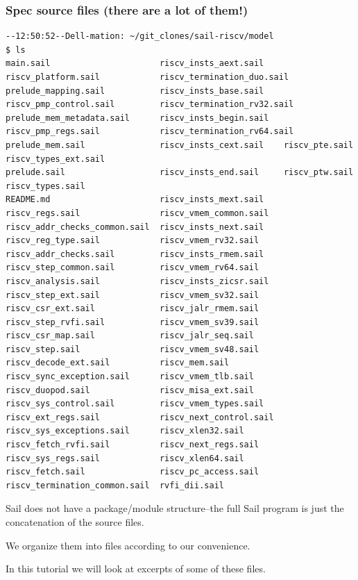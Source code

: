 \documentclass[aspectratio=169]{beamer}
\newcommand{\slidefont}{\scriptsize}
\begin{document}
\begin{frame}[fragile]
  \frametitle{Spec source files (there are a lot of them!)}

  \tiny
  \begin{Verbatim}[frame=single]
--12:50:52--Dell-mation: ~/git_clones/sail-riscv/model
$ ls
main.sail                      riscv_insts_aext.sail    riscv_platform.sail            riscv_termination_duo.sail
prelude_mapping.sail           riscv_insts_base.sail    riscv_pmp_control.sail         riscv_termination_rv32.sail
prelude_mem_metadata.sail      riscv_insts_begin.sail   riscv_pmp_regs.sail            riscv_termination_rv64.sail
prelude_mem.sail               riscv_insts_cext.sail    riscv_pte.sail                 riscv_types_ext.sail
prelude.sail                   riscv_insts_end.sail     riscv_ptw.sail                 riscv_types.sail
README.md                      riscv_insts_mext.sail    riscv_regs.sail                riscv_vmem_common.sail
riscv_addr_checks_common.sail  riscv_insts_next.sail    riscv_reg_type.sail            riscv_vmem_rv32.sail
riscv_addr_checks.sail         riscv_insts_rmem.sail    riscv_step_common.sail         riscv_vmem_rv64.sail
riscv_analysis.sail            riscv_insts_zicsr.sail   riscv_step_ext.sail            riscv_vmem_sv32.sail
riscv_csr_ext.sail             riscv_jalr_rmem.sail     riscv_step_rvfi.sail           riscv_vmem_sv39.sail
riscv_csr_map.sail             riscv_jalr_seq.sail      riscv_step.sail                riscv_vmem_sv48.sail
riscv_decode_ext.sail          riscv_mem.sail           riscv_sync_exception.sail      riscv_vmem_tlb.sail
riscv_duopod.sail              riscv_misa_ext.sail      riscv_sys_control.sail         riscv_vmem_types.sail
riscv_ext_regs.sail            riscv_next_control.sail  riscv_sys_exceptions.sail      riscv_xlen32.sail
riscv_fetch_rvfi.sail          riscv_next_regs.sail     riscv_sys_regs.sail            riscv_xlen64.sail
riscv_fetch.sail               riscv_pc_access.sail     riscv_termination_common.sail  rvfi_dii.sail
  \end{Verbatim}

  \slidefont

  \begin{minipage}{\textwidth}
    Sail does not have a package/module structure--the full Sail
    program is just the concatenation of the source files.

    \vspace{1ex}

    We organize them into files according to our convenience.

    \vspace{1ex}

    In this tutorial we will look at excerpts of some of these files.
  \end{minipage}

\end{frame}
\end{document}
